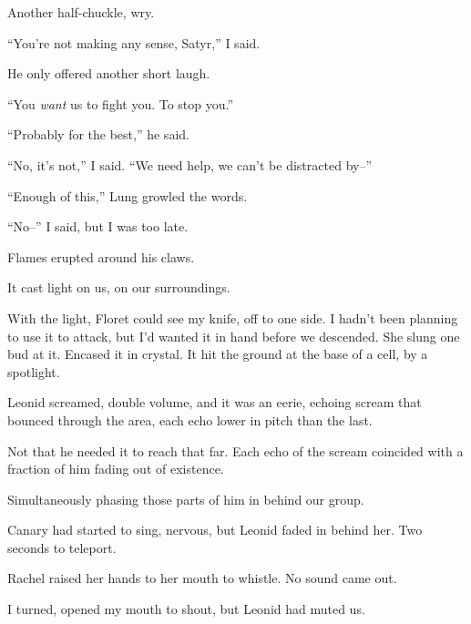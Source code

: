 Another half-chuckle, wry.



``You're not making any sense, Satyr,'' I said.



He only offered another short laugh.



``You \emph{want} us to fight you.  To stop you.''



``Probably for the best,'' he said.



``No, it's not,'' I said.  ``We need help, we can't be distracted by--''



``Enough of this,'' Lung growled the words.



``No--'' I said, but I was too late.



Flames erupted around his claws.



It cast light on us, on our surroundings.



With the light, Floret could see my knife, off to one side.  I hadn't been planning to use it to attack, but I'd wanted it in hand before we descended.  She slung one bud at it.  Encased it in crystal.  It hit the ground at the base of a cell, by a spotlight.



Leonid screamed, double volume, and it was an eerie, echoing scream that bounced through the area, each echo lower in pitch than the last.



Not that he needed it to reach that far.  Each echo of the scream coincided with a fraction of him fading out of existence.



Simultaneously phasing those parts of him in behind our group.



Canary had started to sing, nervous, but Leonid faded in behind her.  Two seconds to teleport.



Rachel raised her hands to her mouth to whistle.  No sound came out.



I turned, opened my mouth to shout, but Leonid had muted us.



